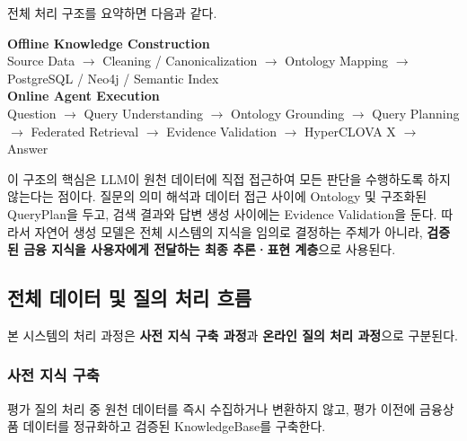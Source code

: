 \documentclass[11pt,a4paper]{article}
\begin{document}
전체 처리 구조를 요약하면 다음과 같다.

\begin{center}
\small
\textbf{Offline Knowledge Construction}\\
Source Data
$\rightarrow$
Cleaning / Canonicalization
$\rightarrow$
Ontology Mapping
$\rightarrow$
PostgreSQL / Neo4j / Semantic Index
\\[0.8em]

\textbf{Online Agent Execution}\\
Question
$\rightarrow$
Query Understanding
$\rightarrow$
Ontology Grounding
$\rightarrow$
Query Planning
$\rightarrow$
Federated Retrieval
$\rightarrow$
Evidence Validation
$\rightarrow$
HyperCLOVA X
$\rightarrow$
Answer
\end{center}

이 구조의 핵심은 LLM이 원천 데이터에 직접 접근하여
모든 판단을 수행하도록 하지 않는다는 점이다.
질문의 의미 해석과 데이터 접근 사이에
Ontology 및 구조화된 QueryPlan을 두고,
검색 결과와 답변 생성 사이에는 Evidence Validation을 둔다.
따라서 자연어 생성 모델은 전체 시스템의 지식을 임의로 결정하는 주체가 아니라,
\textbf{검증된 금융 지식을 사용자에게 전달하는 최종 추론·표현 계층}으로 사용된다.


\subsection{전체 데이터 및 질의 처리 흐름}

본 시스템의 처리 과정은
\textbf{사전 지식 구축 과정}과
\textbf{온라인 질의 처리 과정}으로 구분된다.

\subsubsection{사전 지식 구축}

평가 질의 처리 중 원천 데이터를 즉시 수집하거나 변환하지 않고,
평가 이전에 금융상품 데이터를 정규화하고 검증된 KnowledgeBase를 구축한다.
\end{document}
